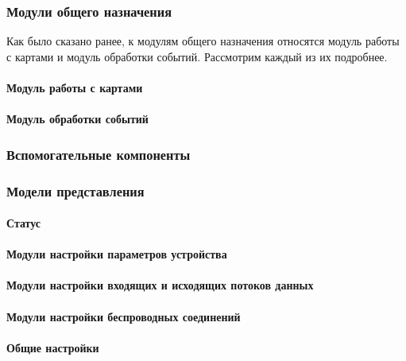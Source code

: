 \subsubsection{Модули общего назначения}

Как было сказано ранее, к модулям общего назначения относятся модуль работы с картами и модуль обработки событий. Рассмотрим каждый из их подробнее.

\paragraph{Модуль работы с картами}

\paragraph{Модуль обработки событий}



\subsubsection{Вспомогательные компоненты}



\subsubsection{Модели представления}

\paragraph{Статус}

\paragraph{Модули настройки параметров устройства}

\paragraph{Модули настройки входящих и исходящих потоков данных}

\paragraph{Модули настройки беспроводных соединений}

\paragraph{Общие настройки}

\newpage
